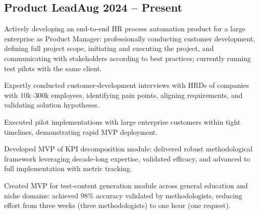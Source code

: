 \documentclass[a4paper,12pt]{article}
\begin{document}
\subsection{{Product Lead}\hfill Aug 2024 -- Present}
\begin{zitemize}
\item Actively developing an end-to-end HR process automation product for a large enterprise as Product Manager: professionally conducting customer development, defining full project scope, initiating and executing the project, and communicating with stakeholders according to best practices; currently running test pilots with the same client.
\item Expertly conducted customer-development interviews with HRDs of companies with 10k--300k employees, identifying pain points, aligning requirements, and validating solution hypotheses.
\item Executed pilot implementations with large enterprise customers within tight timelines, demonstrating rapid MVP deployment.
\item Developed MVP of KPI decomposition module: delivered robust methodological framework leveraging decade-long expertise, validated efficacy, and advanced to full implementation with metric tracking.
\item Created MVP for test-content generation module across general education and niche domains: achieved 98\% accuracy validated by methodologists, reducing effort from three weeks (three methodologists) to one hour (one request).
\end{zitemize}

\vspace*{6pt}
\end{document}
